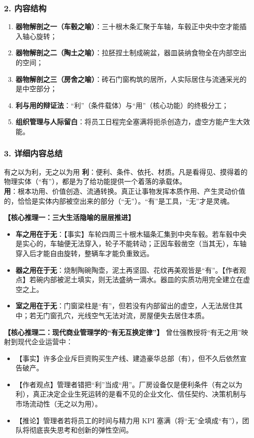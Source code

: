 \subsubsection{2. 内容结构}
\begin{enumerate}
    \item \textbf{器物解剖之一（车毂之喻）}：三十根木条汇聚于车轴，车毂正中央中空才能插入轴心旋转；
    \item \textbf{器物解剖之二（陶土之喻）}：拉胚捏土制成碗盆，器皿装纳食物全在内部空出的空间；
    \item \textbf{器物解剖之三（房舍之喻）}：砖石门窗构筑的居所，人实际居住与流通采光的是中空部分；
    \item \textbf{利与用的辩证法}：“利”（条件载体）与“用”（核心功能）的终极分工；
    \item \textbf{组织管理与人际留白}：将员工日程完全塞满将扼杀创造力，虚空方能产生大效能。
\end{enumerate}

\subsubsection{3. 详细内容总结}

\begin{ConceptBox}{有之以为利，无之以为用}
\textbf{利}：便利、条件、依托、材质。凡是看得见、摸得着的物理实体（“有”），都是为了给功能提供一个着落的承载体。\\
\textbf{用}：根本功用、价值创造、流通转换。真正让事物发挥本质作用、产生灵动价值的，恰恰是实体内部被空出来的部分（“无”）。“有”是工具，“无”才是灵魂。
\end{ConceptBox}

\noindent\textbf{【核心推理一：三大生活隐喻的层层推进】}
\begin{itemize}
    \item \textbf{车之用在于无}：【事实】车轮四周三十根木辐条汇集到中央车毂。若车毂中央是实心的，车轴便无法穿入，轮子不能转动；正因车毂凿空（当其无），车轴穿入后才能自由旋转，整辆车才能负重致远。
    \item \textbf{器之用在于无}：烧制陶碗陶壶，泥土再坚固、花纹再美观皆是“有”。【作者观点】若碗内部被泥土填实，则无法盛纳一滴水。器皿的实质功用完全建立在虚空之上。
    \item \textbf{室之用在于无}：门窗梁柱是“有”，但若没有内部留出的虚空，人无法居住其中；若无门窗孔穴，光线空气无法对流，房屋便失去居住本质。
\end{itemize}

\noindent\textbf{【核心推理二：现代商业管理学的“有无互换定律”】}
曾仕强教授将“有无之用”映射到现代企业运营中：
\begin{itemize}
    \item 【事实】许多企业斥巨资购买生产线、建造豪华总部（有），但不久后依然宣告破产。
    \item 【作者观点】管理者错把“利”当成“用”。厂房设备仅是便利条件（有之以为利），真正决定企业生死运转的是看不见的企业文化、信任契约、决策机制与市场流动性（无之以为用）。
    \item 【推论】管理者若将员工的时间与精力用 KPI 塞满（将“无”全填成“有”），团队将彻底丧失思考和创新的弹性空间。
\end{itemize}

